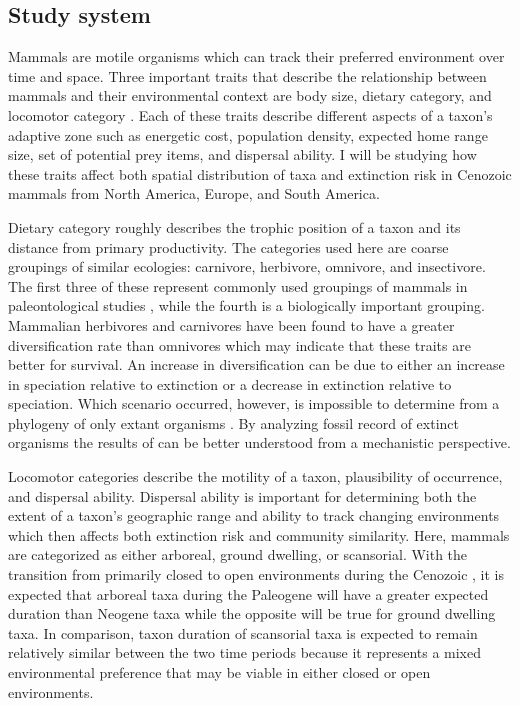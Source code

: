 \documentclass[11pt,letterpaper]{article}
\begin{document}
\subsection{Study system}
Mammals are motile organisms which can track their preferred environment over time and space. Three important traits that describe the relationship between mammals and their environmental context are body size, dietary category, and locomotor category \citep{Smith2004,Smith2008b,Damuth1981a,Damuth1979,Jernvall2004,Lyons2005,Lyons2010}. Each of these traits describe different aspects of a taxon's adaptive zone such as energetic cost, population density, expected home range size, set of potential prey items, and dispersal ability. I will be studying how these traits affect both spatial distribution of taxa and extinction risk in Cenozoic mammals from North America, Europe, and South America.

Dietary category roughly describes the trophic position of a taxon and its distance from primary productivity. The categories used here are coarse groupings of similar ecologies: carnivore, herbivore, omnivore, and insectivore. The first three of these represent commonly used groupings of mammals in paleontological studies \citep{Jernvall2004,Price2012}, while the fourth is a biologically important grouping. Mammalian herbivores and carnivores have been found to have a greater diversification rate than omnivores \citep{Price2012} which may indicate that these traits are better for survival. An increase in diversification can be due to either an increase in speciation relative to extinction or a decrease in extinction relative to speciation. Which scenario occurred, however, is impossible to determine from a phylogeny of only extant organisms \citep{Rabosky2010a}. By analyzing fossil record of extinct organisms the results of \citet{Price2012} can be better understood from a mechanistic perspective.

Locomotor categories describe the motility of a taxon, plausibility of occurrence, and dispersal ability. Dispersal ability is important for determining both the extent of a taxon's geographic range and ability to track changing environments \citep{Birand2012,Jablonski2006a,Gaston2009} which then affects both extinction risk and community similarity. Here, mammals are categorized as either arboreal, ground dwelling, or scansorial. With the transition from primarily closed to open environments during the Cenozoic \citep{Blois2009,Janis1993a,Stromberg2005,Stromberg2013}, it is expected that arboreal taxa during the Paleogene will have a greater expected duration than Neogene taxa while the opposite will be true for ground dwelling taxa. In comparison, taxon duration of scansorial taxa is expected to remain relatively similar between the two time periods because it represents a mixed environmental preference that may be viable in either closed or open environments. 
\end{document}
